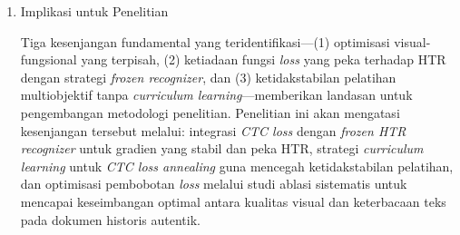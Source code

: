 \documentclass[12pt,a4paper]{article}
\begin{document}
\begin{enumerate}[leftmargin=*, labelindent=0pt, itemsep=1ex, topsep=0pt]
\item Implikasi untuk Penelitian

Tiga kesenjangan fundamental yang teridentifikasi—(1) optimisasi visual-fungsional yang terpisah, (2) ketiadaan fungsi \textit{loss} yang peka terhadap HTR dengan strategi \textit{frozen recognizer}, dan (3) ketidakstabilan pelatihan multiobjektif tanpa \textit{curriculum learning}—memberikan landasan untuk pengembangan metodologi penelitian. Penelitian ini akan mengatasi kesenjangan tersebut melalui: integrasi \textit{CTC loss} dengan \textit{frozen HTR recognizer} untuk gradien yang stabil dan peka HTR, strategi \textit{curriculum learning} untuk \textit{CTC loss annealing} guna mencegah ketidakstabilan pelatihan, dan optimisasi pembobotan \textit{loss} melalui studi ablasi sistematis untuk mencapai keseimbangan optimal antara kualitas visual dan keterbacaan teks pada dokumen historis autentik.

\end{enumerate}
\end{document}
